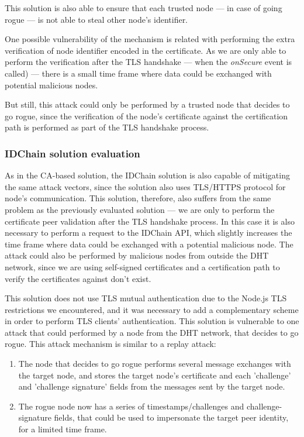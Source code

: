 This solution is also able to ensure that each trusted node — in case of going rogue — is not able to steal other node's identifier.

One possible vulnerability of the mechanism is related with performing the extra verification of node identifier encoded in the certificate.
As we are only able to perform the verification after the TLS handshake — when the \textit{onSecure} event is called) — there is a small time frame where data could be exchanged with potential malicious nodes.

But still, this attack could only be performed by a trusted node that decides to go rogue, since the verification of the node's certificate against the certification path is performed as part of the TLS handshake process.

\subsubsection{IDChain solution evaluation}

As in the CA-based solution, the IDChain solution is also capable of mitigating the same attack vectors, since the solution also uses TLS/HTTPS protocol for node's communication.
This solution, therefore, also suffers from the same problem as the previously evaluated solution — we are only to perform the certificate peer validation after the TLS handshake process.
In this case it is also necessary to perform a request to the IDChain API, which slightly increases the time frame where data could be exchanged with a potential malicious node.
The attack could also be performed by malicious nodes from outside the DHT network, since we are using self-signed certificates and a certification path to verify the certificates against don't exist.

This solution does not use TLS mutual authentication due to the Node.js TLS restrictions we encountered, and it was necessary to add a complementary scheme in order to perform TLS clients' authentication.
This solution is vulnerable to one attack that could performed by a node from the DHT network, that decides to go rogue.
This attack mechanism is similar to a replay attack:

\begin{enumerate}
  \item The node that decides to go rogue performs several message exchanges with the target node, and stores the target node's certificate and each 'challenge' and 'challenge signature' fields from the messages sent by the target node.
  \item The rogue node now has a series of timestamps/challenges and challenge-signature fields, that could be used to impersonate the target peer identity, for a limited time frame.
\end{enumerate}


